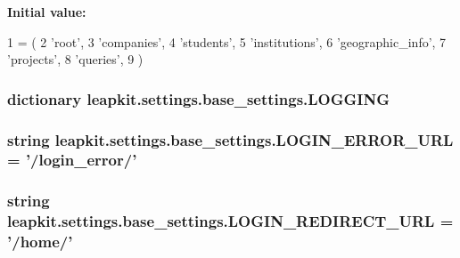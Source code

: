 {\bfseries Initial value\-:}
\begin{DoxyCode}
1 = (
2     \textcolor{stringliteral}{'root'},
3     \textcolor{stringliteral}{'companies'},
4     \textcolor{stringliteral}{'students'},
5     \textcolor{stringliteral}{'institutions'},
6     \textcolor{stringliteral}{'geographic\_info'},
7     \textcolor{stringliteral}{'projects'},
8     \textcolor{stringliteral}{'queries'},
9 )
\end{DoxyCode}
\hypertarget{namespaceleapkit_1_1settings_1_1base__settings_a328250584cfc798b4f3129acc09e81e2}{
\subsubsection[{L\-O\-G\-G\-I\-N\-G}]{\setlength{\rightskip}{0pt plus 5cm}dictionary leapkit.\-settings.\-base\-\_\-settings.\-L\-O\-G\-G\-I\-N\-G}}\label{namespaceleapkit_1_1settings_1_1base__settings_a328250584cfc798b4f3129acc09e81e2}
\hypertarget{namespaceleapkit_1_1settings_1_1base__settings_a84a1ee10a68dfcacdb14e8f48b7c6ac3}{
\subsubsection[{L\-O\-G\-I\-N\-\_\-\-E\-R\-R\-O\-R\-\_\-\-U\-R\-L}]{\setlength{\rightskip}{0pt plus 5cm}string leapkit.\-settings.\-base\-\_\-settings.\-L\-O\-G\-I\-N\-\_\-\-E\-R\-R\-O\-R\-\_\-\-U\-R\-L = '/login\-\_\-error/'}}\label{namespaceleapkit_1_1settings_1_1base__settings_a84a1ee10a68dfcacdb14e8f48b7c6ac3}
\hypertarget{namespaceleapkit_1_1settings_1_1base__settings_a8b805a3cd5b931f74e3eb60d12af04ab}{
\subsubsection[{L\-O\-G\-I\-N\-\_\-\-R\-E\-D\-I\-R\-E\-C\-T\-\_\-\-U\-R\-L}]{\setlength{\rightskip}{0pt plus 5cm}string leapkit.\-settings.\-base\-\_\-settings.\-L\-O\-G\-I\-N\-\_\-\-R\-E\-D\-I\-R\-E\-C\-T\-\_\-\-U\-R\-L = '/home/'}}\label{namespaceleapkit_1_1settings_1_1base__settings_a8b805a3cd5b931f74e3eb60d12af04ab}
